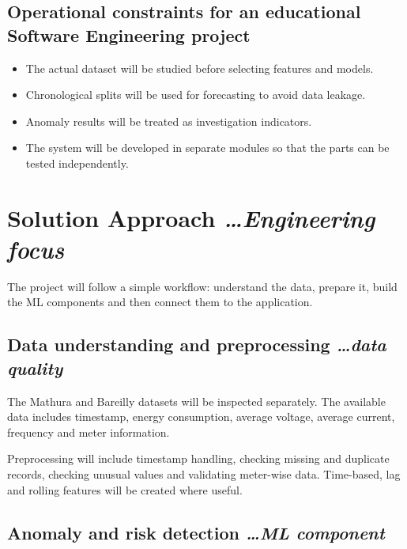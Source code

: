 \documentclass[11pt,a4paper]{article}
\newcommand{\BvrHint}[1]{%
  {\normalfont\normalsize\itshape\hfill #1}}
\begin{document}
\subsection{Operational constraints for an educational Software Engineering project}

\begin{itemize}[leftmargin=0.7cm]

    \item The actual dataset will be studied before selecting
    features and models.

    \item Chronological splits will be used for forecasting to avoid
    data leakage.

    \item Anomaly results will be treated as investigation
    indicators.

    \item The system will be developed in separate modules so that
    the parts can be tested independently.

\end{itemize}

\section{Solution Approach %
  \BvrHint{\ldots Engineering focus}}

The project will follow a simple workflow: understand the data,
prepare it, build the ML components and then connect them to the
application.

\subsection{Data understanding and preprocessing %
  \BvrHint{\ldots data quality}}

The Mathura and Bareilly datasets will be inspected separately. The
available data includes timestamp, energy consumption, average
voltage, average current, frequency and meter information.

Preprocessing will include timestamp handling, checking missing and
duplicate records, checking unusual values and validating meter-wise
data. Time-based, lag and rolling features will be created where
useful.

\subsection{Anomaly and risk detection %
  \BvrHint{\ldots ML component}}
\end{document}
